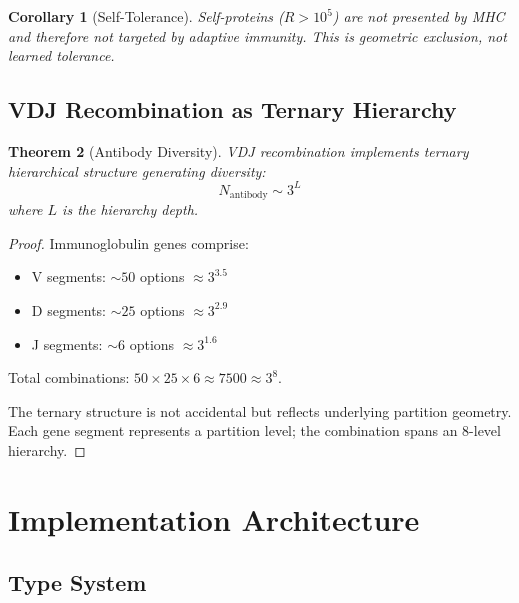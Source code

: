 \documentclass[10pt,twocolumn]{article}
\theoremstyle{plain}
\newtheorem{theorem}{Theorem}[section]
\newtheorem{corollary}[theorem]{Corollary}
\theoremstyle{definition}
\theoremstyle{remark}
\begin{document}
\begin{corollary}[Self-Tolerance]
\label{cor:tolerance}
Self-proteins ($R > 10^5$) are not presented by MHC and therefore not targeted by adaptive immunity. This is geometric exclusion, not learned tolerance.
\end{corollary}

\subsection{VDJ Recombination as Ternary Hierarchy}

\begin{theorem}[Antibody Diversity]
\label{thm:antibody}
VDJ recombination implements ternary hierarchical structure generating diversity:
\begin{equation}
N_{\mathrm{antibody}} \sim 3^L
\label{eq:antibody}
\end{equation}
where $L$ is the hierarchy depth.
\end{theorem}

\begin{proof}
Immunoglobulin genes comprise:
\begin{itemize}
\item V segments: $\sim 50$ options $\approx 3^{3.5}$
\item D segments: $\sim 25$ options $\approx 3^{2.9}$
\item J segments: $\sim 6$ options $\approx 3^{1.6}$
\end{itemize}
Total combinations: $50 \times 25 \times 6 \approx 7500 \approx 3^8$.

The ternary structure is not accidental but reflects underlying partition geometry. Each gene segment represents a partition level; the combination spans an 8-level hierarchy.
\end{proof}

\section{Implementation Architecture}
\label{sec:implementation}

\subsection{Type System}
\end{document}
